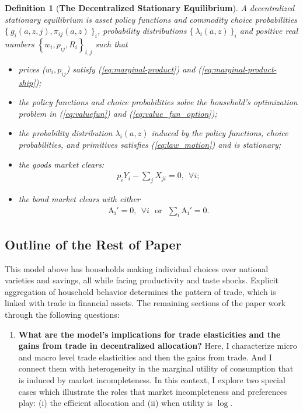 \documentclass[12pt,pdftex]{article}
\newtheorem{df}{Definition}
\begin{document}
\begin{onehalfspacing}
\begin{df}[\textbf{The Decentralized Stationary Equilibrium}] \normalfont A decentralized stationary equilibrium is asset policy functions and commodity choice probabilities $\{\  g_{i}(a, z, j), \pi_{ij}(a, z) \ \}_{i}$, probability distributions $\{ \ \lambda_i(a, z) \ \}_{i}$ and positive real numbers $\left \{w_i, p_{ij}, R_i\right \}_{i,j}$ such that
\begin{itemize}
\item[i]  prices ($w_i, p_{ij}$) satisfy (\ref{eq:marginal-product}) and (\ref{eq:marginal-product-ship});
\item[ii] the policy functions and choice probabilities solve the household's optimization problem in (\ref{eq:valuefun}) and (\ref{eq:value_fun_option});
\item[iii] the probability distribution $\lambda_i(a, z)$ induced by the policy functions, choice probabilities, and primitives satisfies (\ref{eq:law_motion}) and is stationary;
\item[iv] the goods market clears:
\begin{align}
p_{i} Y_{i} - \sum_{j}  X_{ji} = 0, \ \ \forall i;
\end{align}
\item[v] the bond market clears with either
\begin{align}
\mathrm{A_i'} = 0, \ \ \forall i \ \ \ \mbox{or} \ \ \ \sum_{i}\mathrm{A_i'} = 0.
\label{eq:fa-condition}
\end{align}
\end{itemize}
\end{df}


\subsection{Outline of the Rest of Paper}

This model above has households making individual choices over national varieties and savings, all while facing productivity and taste shocks. Explicit aggregation of household behavior determines the pattern of trade, which is linked with trade in financial assets.  The remaining sections of the paper work through the following questions:
\begin{enumerate}
\item \textbf{What are the model's implications for trade elasticities and the gains from trade in decentralized allocation?} Here, I characterize micro and macro level trade elasticities and then the gains from trade. And I connect them with heterogeneity in the marginal utility of consumption that is induced by market incompleteness. In this context, I explore two special cases which illustrate the roles that market incompleteness and preferences play: (i) the efficient allocation and (ii) when utility is $\log$.


\end{enumerate}
\end{onehalfspacing}
\end{document}
